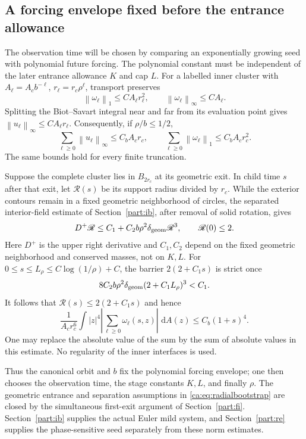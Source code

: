 \documentclass[11pt]{amsart}
\theoremstyle{remark}
\numberwithin{equation}{section}
\newcommand{\norm}[1]{\left\lVert#1\right\rVert}
\newcommand{\dd}{\,\mathrm d}
\begin{document}
\subsection{A forcing envelope fixed before the entrance allowance}
The observation time will be chosen by comparing an exponentially
growing seed with polynomial future forcing. The polynomial constant
must be independent of the later entrance allowance $K$ and cap $L$.
For a labelled inner cluster with
$A_\ell=A_c b^{-\ell}$, $r_\ell=r_c\rho^\ell$, transport preserves
\[
 \norm{\omega_\ell}_1\leq C A_\ell r_\ell^2,\qquad
 \norm{\omega_\ell}_\infty\leq C A_\ell.
\]
Splitting the Biot--Savart integral near and far from its evaluation point
gives $\norm{u_\ell}_\infty\leq C A_\ell r_\ell$.
Consequently, if $\rho/b\leq1/2$,
\[
 \sum_{\ell\geq0}\norm{u_\ell}_\infty\leq C_b A_cr_c,
 \qquad
 \sum_{\ell\geq0}\norm{\omega_\ell}_1\leq C_b A_cr_c^2.
\]
The same bounds hold for every finite truncation.

Suppose the complete cluster lies in $B_{2r_c}$ at its geometric exit.
In child time $s$ after that exit, let $\mathscr R(s)$ be its support
radius divided by $r_c$. While the exterior contours remain in a fixed
geometric neighborhood of circles, the separated interior-field
estimate of Section~\ref{part:ib}, after removal of solid rotation, gives
\begin{equation}\label{ca:eq:radialbootstrap}
 D^+\mathscr R\leq C_1+C_2 b\rho^2\delta_{\rm geom}\mathscr R^3,
 \qquad \mathscr R(0)\leq2.
\end{equation}
Here $D^+$ is the upper right derivative and $C_1,C_2$ depend on the
fixed geometric neighborhood and conserved masses, not on $K,L$.
For $0\leq s\leq L_\rho\leq C\log(1/\rho)+C$, the barrier
$2(2+C_1s)$ is strict once
\[
 8C_2b\rho^2\delta_{\rm geom}(2+C_1L_\rho)^3<C_1.
\]
It follows that $\mathscr R(s)\leq2(2+C_1s)$ and hence
\begin{equation}\label{ca:eq:polymoment}
 \frac1{A_cr_c^6}
 \int |z|^4\left|\sum_{\ell\geq0}\omega_\ell(s,z)\right|\,\dd A(z)
 \leq C_b(1+s)^4.
\end{equation}
One may replace the absolute value of the sum by the sum of absolute
values in this estimate. No regularity of the inner interfaces is used.

Thus the canonical orbit and $b$ fix the polynomial forcing envelope;
one then chooses the observation time, the stage constants $K,L$, and
finally $\rho$. The geometric entrance and separation assumptions in
\eqref{ca:eq:radialbootstrap} are closed by the simultaneous first-exit
argument of Section~\ref{part:fi}. Section~\ref{part:ib} supplies the
actual Euler mild system, and Section~\ref{part:re} supplies the
phase-sensitive seed separately from these norm estimates.
\end{document}
